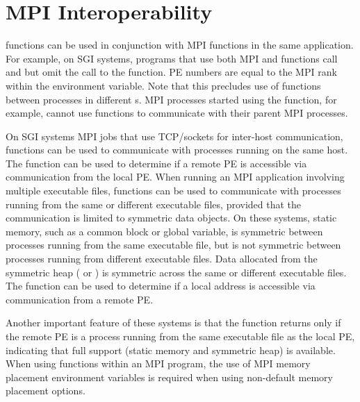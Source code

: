 \section{\ac{MPI} Interoperability}
\begin{sloppypar} %
\openshmem functions can be used in conjunction with \ac{MPI}
functions  in the same application.  For example, on SGI systems, programs that use both \ac{MPI} and \openshmem functions call  and  but omit the call to the  function.  \openshmem \ac{PE} numbers are equal to the \ac{MPI} rank within the  environment variable.  Note that this precludes use of \openshmem functions between processes in different s. 
\ac{MPI} processes started using the  function, for
example, cannot use \openshmem functions to communicate with their parent
\ac{MPI} processes.
\end{sloppypar}
On SGI systems \ac{MPI} jobs that use TCP/sockets for inter-host communication, \openshmem functions can be used to communicate with processes running on the same host.  The  function can be used to determine if a remote \ac{PE} is accessible via \openshmem communication from the local \ac{PE}. When running an \ac{MPI} application involving multiple executable files, \openshmem functions can be used to communicate with processes running from the same or different executable files, provided that the communication is limited to symmetric data objects.  On these systems, static memory, such as a \Fortran{} common block or \Clang{} global variable, is symmetric between processes running from the same executable file, but is not symmetric between processes running from different executable files.  Data allocated from the symmetric heap ( or ) is symmetric across the same or different executable files. The function  can be used to determine if a local address is accessible via \openshmem communication from a remote \ac{PE}.

 Another important feature of these systems is that the  function returns  only if the remote \ac{PE} is a process running from the same executable file as the local PE, indicating that full \openshmem support (static memory and symmetric heap) is available.  When using \openshmem functions within an \ac{MPI} program, the use of \ac{MPI} memory placement environment variables is required when using non-default memory placement options.
